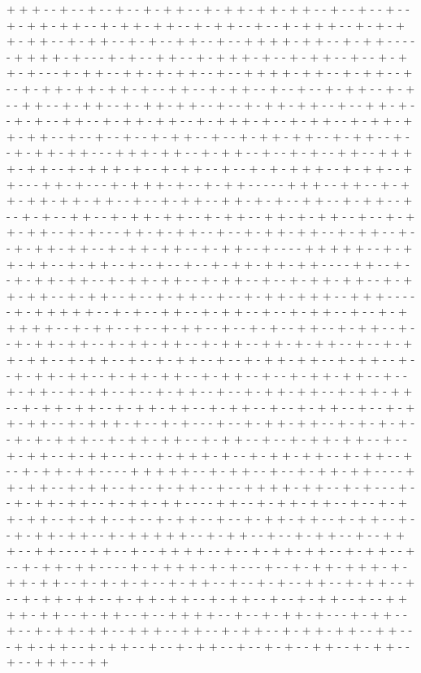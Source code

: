 + + + - - + - - + - - + - - + - + + - - + - + + - + + - + + - - + - - + - - + - - + - + + - + + - - + - + + - + + - - + - + + - - + - - + - + + + - - + - + - + + - + + - - + - + + - - + - + - - + + - - + - - + + + + - + + - - + - + + - - - - - + + + + - + - - - + - + - - + + - - + - + + + - + - - + - + + - - + - - + - + + - + - - - + - + + - - + + - + - + + - - + - - + + + + - + + - - + - + + - - + - - + - + + - + + - + + - + - - + + - - + - + + - - + - - + - - + - + + - - + - + - - + + - - + - + + - - + - + + - + + - - + - - + - + + - + + - - + - - + + - + - - + - + - - + + - - + - + + - + + - - + - + + + - + - - + - + + - - + - + + - + + - + + - - + - - + - - + - - + - + + - - + - - + - + + - + + - - + - + + - - + - - + - + + - + + - - - + + + - + + - - + - + + - - + - - + - + - - + + - - + + + + - + + - - + - + + + - + - - + - + + - - + - - + - + - + + + - - + - + + - - + + - - - + + - + - - - + - + + + - + - - + - + + - - - - - + + + - - + + - - + - + + - + + - + + - + + - - + - - + - + + - - + + - + - + - - + + - - + - + + - - + - - + - + - - + + - - + - + + - + + - - + - + + - - + + - + - + + - - + - - + - + + - + + - - + - + - - - + + - + - + + - - + - - + - + + - + + - - + - + + - - + - - + - + + - + + - - + - + + - + + - - + - + + - - + - - - - + + + + + - - + - + + - + + - - + - + + - - + - - + - - + - - + - + + - + + - + + - - - - + + - - + - - + - + + - + + - - + - + + - + + - - + - + + - - + - - + - + + - + + - - + - + + - + + - - + - + + - - + - - + - + + - - + - - + - + + - + + + - - + + + - - - - - + - + + + + + - - + - + - - + + - - + - + + - - + - - + - + + - - + - - + - + + + + + - - + - + + - - + - - + - + + - - + - - + - + - - + + - - + - + + - - + - - + - + + - + + - - + - + + - + + - - + - + + - - + + - + - + + - - + - - + - + + - + + - - + - + + - - + - - + - + + - - + - - + - + + - + + - - + - + + - - + - - + - + + - + + - - + - + + - + + - - + - + + - - + - - + - + + - + + - - + - - + - + + - - + - + + - - + - - + - + + - - + - - + - + + - + + - - + - + + - + + - - + - + + - + + - - + - + + - + + - - + - + + - - + - - + - + + - - + - - + - + + - + + - - + - + + + - + - - + - + - - - + - - + - + + - + + - - + - + - + - + - - + - + - + + + - - + - + + - + + - - + - + + - - + - - + - + + - + + - - + - - + - + + - - + - + + - - + - - + - + + + - + - - + - + + - + + - - + - + + - - + - - + - + + - + + - - - - + + + + + - - + - + + - - + - - + - + + - + + - - - - + + - + + - - + - + + - - + - - + - + + - - + - - + + + + - + + - - + - + - - - + - - + - + + - + + - - + - + + - + + - - - - + + - - + - + + - + + - - + - - + - + + - + + - - + - + + - - + - - + - + + - - + - - + - + + - + + - - + - + + - - + - - + - + + - + + - - + - + + + + + - - + - + + - - + - - + - + + - - + - - + + + - - + + - - - - + + - - + - - + + + + - - + - - + - + + - + + - - + - + + - - + - - + - + + - + + - - - - + - + + + + - + - + - - - + - - + - + + - + + + - + - + + - + + - - + - + - + - + - - + - + + - - + - - + - + - - + + - - + - + + - - + - - + - + + - + + - - + - + + - + + - - + - + + - - + - - + - + + - - + - - + + + + - + + - - + - + + - - + - - + + + + - - + - - + - + + - + - - - + - + + - - + - - + - + + - + + - - + + + - - + + - - + - + + - - + - + + - + + - - + + - - - + + - + + - - + - + + - - + - - + - + + - - + - - + - + - - + + - - + - + + - - + - - + + + - - + + 